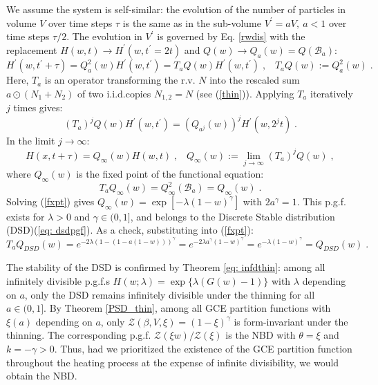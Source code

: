 \documentclass[a4paper,12pt]{amsart}
\newcommand{\iid}{i.i.d.}
\theoremstyle{definition}
\theoremstyle{remark}
\begin{document}
We assume the system is self-similar: the evolution of the number of particles in volume $V$ over time steps $\tau$ is the same as in the sub-volume $V^{\prime}= aV, ~a<1$ over time steps $\tau/2$. The evolution in  $V^{\prime}$ is governed by Eq. \ref{rwdis} with the  replacement $H(w,t) \to H^{\prime}(w,t^{\prime}=2t)$ and $Q(w) \to Q_a(w)=Q(\mathcal{B}_a)$: 
\begin{equation}
H^{\prime}(w,t^{\prime}+ \tau)= Q^2_{a}(w) H^{\prime}(w,t^{\prime})= T_{a}Q(w)H^{\prime}(w,t^{\prime})\;, \;\;\; T_{a}Q(w):= Q^2_a(w)\;.
\label{RGdis}
\end{equation}
Here, $T_a$ is an operator transforming the r.v. $N$ into the rescaled sum $a\odot (N_1\!+\!N_2)$ of two \iid copies $N_{1,2}= N$ (see (\ref{thin})). Applying $T_a$ iteratively $j$ times gives:
\begin{equation}
(T_a)^j Q(w)H^{\prime}(w,t^{\prime}) = (Q_{a^j}(w))^j H^{\prime}(w, 2^j t)\;.
\label{rgdism}
\end{equation}
 In the limit $j \to \infty$:
\begin{equation}\label{inflim}
H(x, t+ \tau) = Q_{\infty}(w)H(w,t)\;,\;\;\; Q_{\infty}(w):= \lim_{j \to\infty}(T_a)^{j} Q(w)\;,
\end{equation}
where $Q_{\infty}(w)$  is the fixed point of the functional equation: 
\begin{equation}
\label{fxpt}
T_{a}Q_{\infty}(w)= Q_{\infty}^2(\mathcal{B}_a) = Q_{\infty}(w)\;.
\end{equation}
Solving (\ref{fxpt}) gives  $Q_{\infty}(w)=\exp[-\lambda(1-w)^{\gamma}]$ with $2a^\gamma=1$. This p.g.f. exists for $\lambda>0$ and $\gamma \in (0, 1]$, and belongs to the Discrete Stable distribution (DSD)(\ref{eq: dsdpgf}). As a check, substituting into (\ref{fxpt}):
\begin{equation}
T_a Q_{DSD}(w) = e^{-2\lambda(1- (1-a(1- w)))^{\gamma}} = 
e^{-2\lambda a^{\gamma}(1-w)^{\gamma}}= e^{-\lambda(1-w)^{\gamma}} = Q_{DSD}(w)\;.
\end{equation}

The stability of the DSD is confirmed by Theorem \ref{eq: infdthin}: among all infinitely divisible p.g.f.{}s $H(w;\lambda)=\exp\{ \lambda (G(w)-1)\}$ with $\lambda$ depending on $a$, only the DSD remains infinitely divisible under the thinning for all $a\in (0,1]$.  By Theorem \ref{PSD_thin}, among all GCE partition functions with $\xi(a)$ depending on $a$, only 
$\mathcal{Z}(\beta,V,\xi)=(1-\xi)^{\gamma}$ is form-invariant under the thinning. The corresponding p.g.f. $\mathcal{Z}(\xi w)/\mathcal{Z}(\xi)$ is the NBD with $\theta=\xi$ and $k=-\gamma>0$. Thus, had we prioritized the existence of the GCE partition function throughout the heating process at the expense of infinite divisibility,  we would obtain the NBD.
\end{document}
